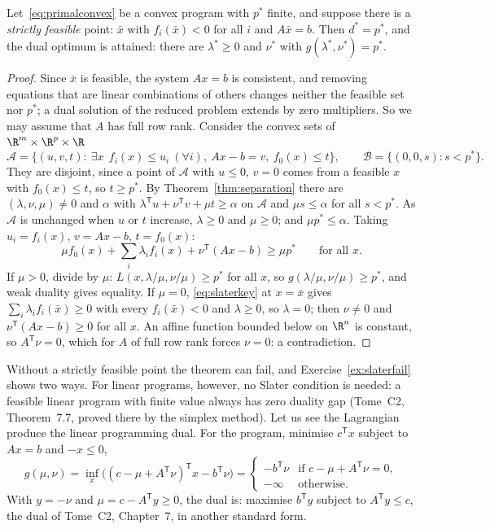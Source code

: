 \begin{theorem}[Slater, 1950]\label{thm:slater}
Let~\eqref{eq:primalconvex} be a convex program with $p^*$ finite, and suppose there is a \emph{strictly feasible} point: $\bar x$ with $f_i(\bar x)<0$ for all $i$ and $A\bar x=b$. Then
$d^*=p^*$, and the dual optimum is attained: there are $\lambda^*\ge0$ and $\nu^*$ with $g(\lambda^*,\nu^*)=p^*$.
\end{theorem}
\begin{proof}
Since $\bar x$ is feasible, the system $Ax=b$ is consistent, and removing equations that are linear combinations of others changes neither the feasible set nor
$p^*$; a dual solution of the reduced problem extends by zero multipliers. So we may assume that $A$ has full row rank. Consider the convex sets of $\R^m\times\R^p\times\R$
\[
\mathcal A=\{(u,v,t):\ \exists x\ \ f_i(x)\le u_i\ (\forall i),\ Ax-b=v,\ f_0(x)\le t\},\qquad\mathcal B=\{(0,0,s):s<p^*\}.
\]
They are disjoint, since a point of $\mathcal A$ with $u\le0$, $v=0$ comes from a feasible $x$ with $f_0(x)\le t$, so $t\ge p^*$. By Theorem~\ref{thm:separation} there are
$(\lambda,\nu,\mu)\ne0$ and $\alpha$ with $\lambda^{\mathsf T}u+\nu^{\mathsf T}v+\mu t\ge\alpha$ on $\mathcal A$ and $\mu s\le\alpha$ for all $s<p^*$. As $\mathcal A$ is unchanged when $u$ or $t$ increase,
$\lambda\ge0$ and $\mu\ge0$; and $\mu p^*\le\alpha$. Taking $u_i=f_i(x)$, $v=Ax-b$, $t=f_0(x)$:
\begin{equation}\label{eq:slaterkey}
\mu f_0(x)+\sum_i\lambda_if_i(x)+\nu^{\mathsf T}(Ax-b)\ge\mu p^*\qquad\text{for all }x.
\end{equation}
If $\mu>0$, divide by $\mu$: $L(x,\lambda/\mu,\nu/\mu)\ge p^*$ for all $x$, so $g(\lambda/\mu,\nu/\mu)\ge p^*$, and weak duality gives equality. If $\mu=0$, \eqref{eq:slaterkey} at
$x=\bar x$ gives $\sum_i\lambda_if_i(\bar x)\ge0$ with every $f_i(\bar x)<0$ and $\lambda\ge0$, so $\lambda=0$; then $\nu\ne0$ and $\nu^{\mathsf T}(Ax-b)\ge0$ for all $x$. An affine function
bounded below on $\R^n$ is constant, so $A^{\mathsf T}\nu=0$, which for $A$ of full row rank forces $\nu=0$: a contradiction.
\end{proof}

Without a strictly feasible point the theorem can fail, and Exercise~\ref{ex:slaterfail} shows two ways. For linear programs, however, no Slater condition is needed: a
feasible linear program with finite value always has zero duality gap (Tome~C2, Theorem~7.7, proved there by the simplex method). Let us see the Lagrangian
produce the linear programming dual. For the program, minimise $c^{\mathsf T}x$ subject to $Ax=b$ and $-x\le0$,
\[
g(\mu,\nu)=\inf_x\bigl((c-\mu+A^{\mathsf T}\nu)^{\mathsf T}x-b^{\mathsf T}\nu\bigr)=\begin{cases}-b^{\mathsf T}\nu&\text{if }c-\mu+A^{\mathsf T}\nu=0,\\-\infty&\text{otherwise.}\end{cases}
\]
With $y=-\nu$ and $\mu=c-A^{\mathsf T}y\ge0$, the dual is: maximise $b^{\mathsf T}y$ subject to $A^{\mathsf T}y\le c$, the dual of Tome~C2, Chapter~7, in another standard form.

